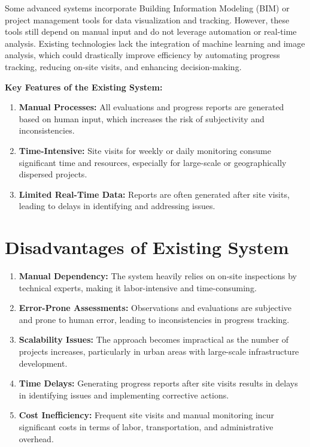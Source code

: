 Some advanced systems incorporate Building Information Modeling (BIM) or project management tools for data visualization and tracking. However, these tools still depend on manual input and do not leverage automation or real-time analysis. Existing technologies lack the integration of machine learning and image analysis, which could drastically improve efficiency by automating progress tracking, reducing on-site visits, and enhancing decision-making.

\textbf{Key Features of the Existing System:}
\begin{enumerate}
    \item \textbf{Manual Processes:} All evaluations and progress reports are generated based on human input, which increases the risk of subjectivity and inconsistencies.
    \item \textbf{Time-Intensive:} Site visits for weekly or daily monitoring consume significant time and resources, especially for large-scale or geographically dispersed projects.
    \item \textbf{Limited Real-Time Data:} Reports are often generated after site visits, leading to delays in identifying and addressing issues.
\end{enumerate}

\section{Disadvantages of Existing System}
\begin{enumerate}
    \item \textbf{Manual Dependency:} The system heavily relies on on-site inspections by technical experts, making it labor-intensive and time-consuming.
    \item \textbf{Error-Prone Assessments:} Observations and evaluations are subjective and prone to human error, leading to inconsistencies in progress tracking.
    \item \textbf{Scalability Issues:} The approach becomes impractical as the number of projects increases, particularly in urban areas with large-scale infrastructure development.
    \item \textbf{Time Delays:} Generating progress reports after site visits results in delays in identifying issues and implementing corrective actions.
    \item \textbf{Cost Inefficiency:} Frequent site visits and manual monitoring incur significant costs in terms of labor, transportation, and administrative overhead.
\end{enumerate}

